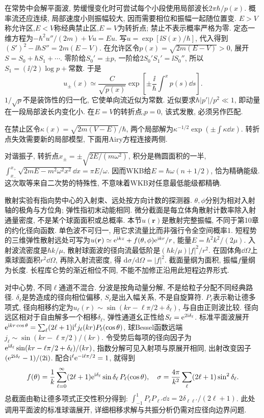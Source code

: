 在常势中会解平面波, 势缓慢变化时可尝试每个小段使用局部波长$2\pi\hbar/p(x)$. 概率流还应连续, 局部速度小则振幅较大, 因而需要相位和振幅一起随位置变. $E>V$称允许区,$E<V$称经典禁止区,$E=V$为转折点; 禁止不表示概率严格为零. 定态一维方程为$-\hbar^2u''/(2m)+Vu=Eu$. 写$u=\exp[\ii S(x)/\hbar]$, 代入得到$(S')^2-\ii\hbar S''=2m(E-V)$. 在允许区令$p(x)=\sqrt{2m(E-V)}>0$, 展开$S=S_0+\hbar S_1+\cdots$. 零阶给$S_0'=\pm p$, 一阶给$2S_0'S_1'=\ii S_0''$, 所以$S_1=(\ii/2)\log p+\text{常数}$. 于是
\[
u_\pm(x)\simeq\frac C{\sqrt{p(x)}}
\exp\left[\pm\frac{\ii}{\hbar}\int^x p(s)\dd s\right].
\]
$1/\sqrt p$不是装饰性的归一化, 它使单向流近似为常数. 近似要求$\hbar|p'|/p^2\ll1$, 即动量在一段局部波长内变化小. 在$E=V$的转折点,$p=0$, 该式发散, 必须另作匹配.

在禁止区令$\kappa(x)=\sqrt{2m(V-E)}/\hbar$, 两个局部解为$\kappa^{-1/2}\exp(\pm\int\kappa\dd x)$. 转折点失效需要新的局部模型, 下面用Airy方程连接两侧.


对谐振子, 转折点$x_\pm=\pm\sqrt{2E/(m\omega^2)}$, 积分是椭圆面积的一半,$\int_{x_-}^{x_+}\sqrt{2mE-m^2\omega^2x^2}\dd x=\pi E/\omega$. 因而WKB给$E=\hbar\omega(n+1/2)$, 恰为精确能级. 这次取等来自二次势的特殊性, 不意味着WKB对任意最低能级都精确.

散射实验有指向势中心的入射束、远处按方向计数的探测器. $\theta,\phi$分别为相对入射轴的极角与方位角; 弹性指初末动能相同. 微分截面是每立体角散射计数率除入射通量密度, 不是某个球面面积或总概率. 本节$u(\boldsymbol r)$是散射完整振幅, 不同于第10章的约化径向函数. 单色波不可归一, 用它求流量比而非强行令全空间概率1. 短程势的三维弹性散射远处可写为$u(\boldsymbol r)\simeq\mathrm e^{\mathrm i kz}+f(\theta,\phi)\mathrm e^{\mathrm i kr}/r$, 能量$E=\hbar^2k^2/(2\mu)$. 入射波流密度是$\hbar k/\mu$, 散射球面波的径向流最低阶是$(\hbar k/\mu)|f|^2/r^2$. 在固体角$\dd\Omega$上乘球面面积$r^2\dd\Omega$, 再除入射流密度, 得
$\mathrm d\sigma/\mathrm d\Omega=|f|^2$. 截面量纲为面积, 振幅$f$量纲为长度. 长程库仑势的渐近相位不同, 不能不加修正沿用此短程边界形式.

对中心势, 不同$\ell$通道不混合. 分波是按角动量分解, 不是给粒子分配不同经典路径. $\delta_\ell$是势造成的径向相位偏移, $S_\ell$是出入幅关系, 不是自旋算符. $P_\ell$表示勒让德多项式, 径向相移约定为$u_\ell(r)\sim\sin(kr-\ell\pi/2+\delta_\ell)$, 与自由正则波比较. 径向远区相对于自由解多一个相移$\delta_\ell$, 弹性通道幺正性给$S_\ell=\mathrm e^{2\mathrm i\delta_\ell}$. 标准平面波展开$\mathrm e^{\mathrm i kr\cos\theta}=\sum_\ell(2\ell+1)\mathrm i^\ell j_\ell(kr)P_\ell(\cos\theta)$, 球Bessel函数远端$j_\ell\sim\sin(kr-\ell\pi/2)/(kr)$. 令受势后每项的径向因子为$\mathrm e^{\mathrm i\delta_\ell}\sin(kr-\ell\pi/2+\delta_\ell)/(kr)$, 指数分解可见入射项与原展开相同, 出射改变因子$(\mathrm e^{2\mathrm i\delta_\ell}-1)/(2\mathrm i)$. 配合$\mathrm i^\ell\mathrm e^{-\mathrm i\ell\pi/2}=1$, 就得到
\[
f(\theta)=\frac1k\sum_{\ell=0}^\infty
(2\ell+1)\mathrm e^{\mathrm i\delta_\ell}\sin\delta_\ell\,P_\ell(\cos\theta),
\quad
\sigma=\frac{4\pi}{k^2}\sum_\ell(2\ell+1)\sin^2\delta_\ell.
\]
总截面由勒让德多项式正交性积分得到: $\int_{-1}^1P_\ell P_{\ell'}\dd z=2\delta_{\ell\ell'}/(2\ell+1)$. 此处调用平面波的标准球谐展开, 详细相移求解与共振分析仍需对应径向边界问题.


